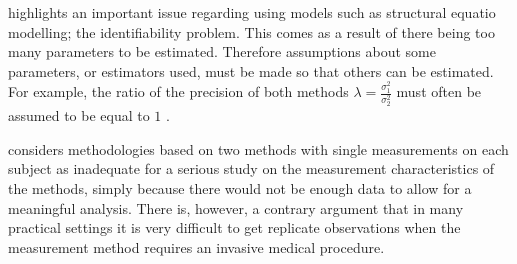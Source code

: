 \documentclass[12pt, a4paper]{report}
\theoremstyle{plain}
\theoremstyle{definition}
\theoremstyle{remark}
\begin{document}
\citet{DunnSEME} highlights an important issue regarding using
models such as structural equatio modelling; the identifiability problem. This comes as a result of there being too many parameters to be estimated.
Therefore assumptions about some parameters, or estimators used,
must be made so that others can be estimated. For example, the ratio of the precision of both methods $\lambda=\frac{\sigma^{2}_{1}}{\sigma^{2}_{2}}$
must often be assumed to be equal to $1$ \citep{linnet98}. 

\citet{DunnSEME} considers methodologies based on two methods with single measurements on each subject as inadequate for a serious study on the measurement characteristics of the methods, simply because there would not be enough data to allow for a meaningful analysis. There is, however, a contrary argument that in many practical settings it is very difficult to get replicate
observations when the measurement method requires an invasive medical
procedure.




\end{document}
